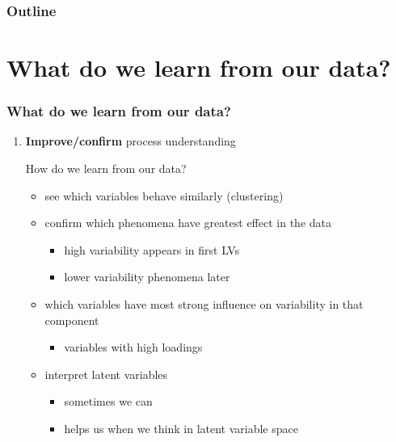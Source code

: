 \documentclass[handout, 12pt]{beamer}
\begin{document}
\begin{frame}\frametitle{Outline}
\tableofcontents
\end{frame}

\section{What do we learn from our data?}

\begin{frame}\frametitle{What do we learn from our data?}

\begin{enumerate}
	\item {\bf \color{myGreen}Improve/confirm} process understanding
	
		 How do we learn from our data?
\begin{itemize}

	\item	see which variables behave similarly (clustering) \pause
	\item	confirm which phenomena have greatest effect in the data 
	\begin{itemize}
		\item	high variability appears in first LVs
		\item	lower variability phenomena later
	\end{itemize}\pause

	\item	which variables have most strong influence on variability in that component
	\begin{itemize}
		\item variables with high loadings
	\end{itemize}\pause

	\item	interpret latent variables
	\begin{itemize}
		\item	sometimes we can
		\item	helps us when we think in latent variable space
	\end{itemize}
\end{itemize}
\end{enumerate}
\end{frame}
\end{document}
